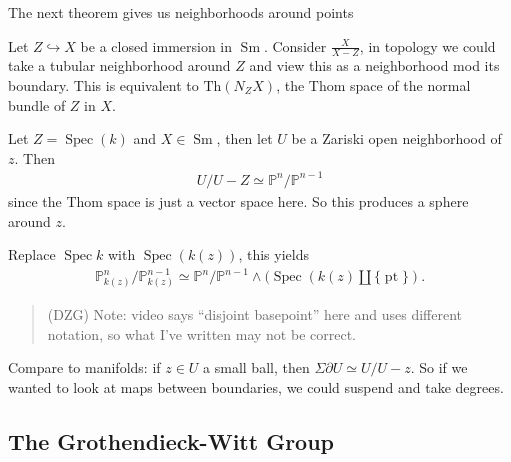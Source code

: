 The next theorem gives us neighborhoods around points

\begin{theorem}

Let \(Z \hookrightarrow X\) be a closed immersion in
\({\operatorname{Sm}}\). Consider \(\frac X {X-Z}\), in topology we
could take a tubular neighborhood around \(Z\) and view this as a
neighborhood mod its boundary. This is equivalent to
\(\text{Th}(N_Z X)\), the Thom space of the normal bundle of \(Z\) in
\(X\).

\end{theorem}

\begin{example}[?]

Let \(Z =\operatorname{Spec}(k)\) and \(X \in {\operatorname{Sm}}\),
then let \(U\) be a Zariski open neighborhood of \(z\). Then
\begin{align*}
U/U-Z \simeq{\mathbb{P}}^n / {\mathbb{P}}^{n-1}
\end{align*}
since the Thom space is just a vector space here. So this produces a
sphere around \(z\).

\end{example}

\begin{example}[?]

Replace \(\operatorname{Spec}k\) with \(\operatorname{Spec}(k(z))\),
this yields
\begin{align*}
{\mathbb{P}}^n_{k(z)} / {\mathbb{P}}^{n-1}_{k(z)} \simeq{\mathbb{P}}^n / {\mathbb{P}}^{n-1} \wedge (\operatorname{Spec}(k(z)\coprod {\{\operatorname{pt}\}})
.\end{align*}

\end{example}

\begin{quote}
(DZG) Note: video says ``disjoint basepoint'' here and uses different
notation, so what I've written may not be correct.
\end{quote}

Compare to manifolds: if \(z\in U\) a small ball, then
\(\Sigma {\partial}U \simeq U / U - z\). So if we wanted to look at maps
between boundaries, we could suspend and take degrees.

\hypertarget{the-grothendieck-witt-group-1}{%
\subsection{The Grothendieck-Witt
Group}\label{the-grothendieck-witt-group-1}}

